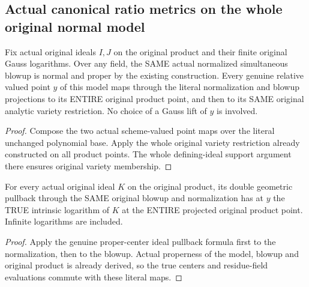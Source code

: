 \subsection{Actual canonical ratio metrics on the whole original normal model}

\begin{definition}
\label{local:actual-normalized-full-point-restriction}
\leanok
{}
Fix actual original ideals $I,J$ on the original product and their finite
original Gauss logarithms. Over any field, the SAME actual normalized
simultaneous blowup is normal and proper by the existing construction.
Every genuine relative valued point $y$ of this model maps through the
literal normalization and blowup projections to its ENTIRE original
product point, and then to its SAME original analytic variety restriction.
No choice of a Gauss lift of $y$ is involved.
\end{definition}
\begin{proof}
Compose the two actual scheme-valued point maps over the literal unchanged
polynomial base. Apply the whole original variety restriction already
constructed on all product points. The whole defining-ideal support
argument there ensures original variety membership.
\end{proof}

\begin{lemma}
\label{local:actual-normalized-full-point-ideal-log}
\leanok
{}
For every actual original ideal $K$ on the original product, its double
geometric pullback through the SAME original blowup and normalization
has at $y$ the TRUE intrinsic logarithm of $K$ at the ENTIRE projected
original product point. Infinite logarithms are included.
\end{lemma}
\begin{proof}
Apply the genuine proper-center ideal pullback formula first to the
normalization, then to the blowup. Actual properness of the model,
blowup and original product is already derived, so the true centers and
residue-field evaluations commute with these literal maps.
\end{proof}

